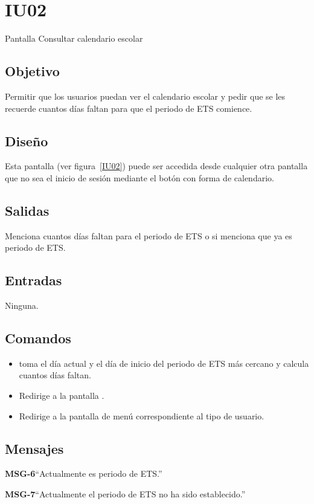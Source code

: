 
\section{IU02} {Pantalla Consultar calendario escolar}

\subsection{Objetivo}
Permitir que los usuarios puedan ver el calendario escolar y pedir que se les recuerde cuantos días faltan para que el periodo de ETS comience.
\subsection{Diseño}
    Esta pantalla  (ver figura~\ref{IU02}) puede ser accedida desde cualquier otra pantalla que no sea el inicio de sesión mediante el botón con forma de calendario.


\newpage


\subsection{Salidas}

    Menciona cuantos días faltan para el periodo de ETS o si menciona que ya es periodo de ETS.

\subsection{Entradas}
   Ninguna.

\subsection{Comandos}
\begin{itemize}
    \item {} toma el día actual y el día de inicio del periodo de ETS más cercano y calcula cuantos días faltan.
    \item {} Redirige a la pantalla .
    \item {} Redirige a la pantalla de menú correspondiente al tipo de usuario.
\end{itemize}

\subsection{Mensajes}
     
\begin{Citemize}
    \item {\bf MSG-6}{``Actualmente es periodo de ETS.''}

    \item {\bf MSG-7}{``Actualmente el periodo de ETS no ha sido establecido.''}
\end{Citemize}

